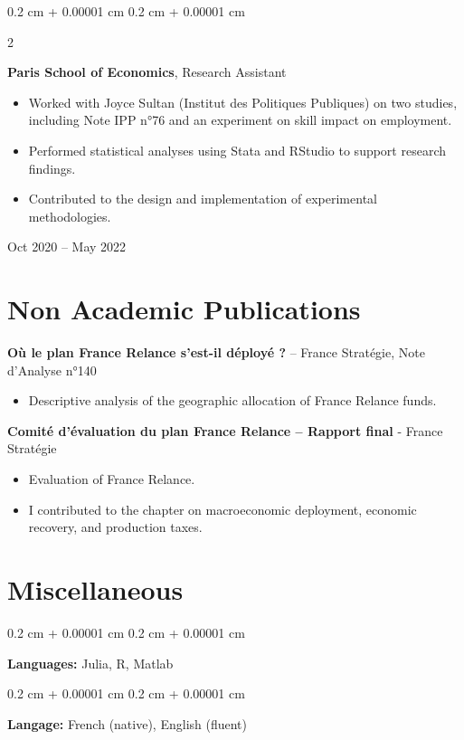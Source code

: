 \documentclass[10pt, letterpaper]{article}
\newenvironment{highlights}{
    \begin{itemize}[
        topsep=0.10 cm,
        parsep=0.10 cm,
        partopsep=0pt,
        itemsep=0pt,
        leftmargin=0.4 cm + 10pt
    ]
}{
    \end{itemize}
} %
\newenvironment{onecolentry}{
    \begin{adjustwidth}{
        0.2 cm + 0.00001 cm
    }{
        0.2 cm + 0.00001 cm
    }
}{
    \end{adjustwidth}
} %
\newenvironment{twocolentry}[2][]{
    \onecolentry
    \def\secondColumn{#2}
    \setcolumnwidth{\fill, 4.5 cm}
    \begin{paracol}{2}
}{
    \switchcolumn \raggedleft \secondColumn
    \end{paracol}
    \endonecolentry
} %
\begin{document}
\vspace{0.2 cm}

\begin{twocolentry}{
    Oct 2020 – May 2022
}
    \textbf{Paris School of Economics}, Research Assistant
    \begin{highlights}
        \item Worked with Joyce Sultan (Institut des Politiques Publiques) on two studies, including Note IPP n°76 and an experiment on skill impact on employment.
        \item Performed statistical analyses using Stata and RStudio to support research findings.
        \item Contributed to the design and implementation of experimental methodologies.
    \end{highlights}
\end{twocolentry}

\section{Non Academic Publications}
\textbf{ Où le plan France Relance s’est-il déployé ?} – France Stratégie, Note d'Analyse n°140 
\begin{highlights}
    \item Descriptive analysis of the geographic allocation of France Relance funds.
\end{highlights}

\vspace{0.2 cm}

\textbf{Comité d'évaluation du plan France Relance – Rapport final} - France Stratégie 
\begin{highlights}
        \item Evaluation of France Relance.
        \item I contributed to the chapter on macroeconomic deployment, economic recovery, and production taxes.
\end{highlights} 

\section{Miscellaneous}
        
        \begin{onecolentry}
            \textbf{Languages:} Julia, R, Matlab
        \end{onecolentry}

        \vspace{0.2 cm}

        \begin{onecolentry}
            \textbf{Langage:} French (native), English (fluent)
        \end{onecolentry}
\end{document}
